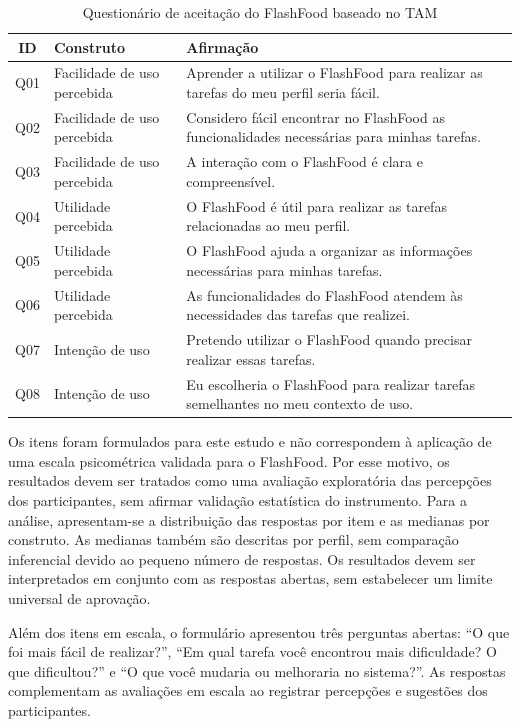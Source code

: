 \begin{table}[htbp]
\centering
\caption{Questionário de aceitação do FlashFood baseado no TAM}
\label{tab:questionario-tam}
\footnotesize
\begin{tabularx}{\textwidth}{c p{3.2cm} X}
\hline
\textbf{ID} & \textbf{Construto} & \textbf{Afirmação} \\
\hline
Q01 & Facilidade de uso percebida & Aprender a utilizar o FlashFood para realizar as tarefas do meu perfil seria fácil. \\
\hline
Q02 & Facilidade de uso percebida & Considero fácil encontrar no FlashFood as funcionalidades necessárias para minhas tarefas. \\
\hline
Q03 & Facilidade de uso percebida & A interação com o FlashFood é clara e compreensível. \\
\hline
Q04 & Utilidade percebida & O FlashFood é útil para realizar as tarefas relacionadas ao meu perfil. \\
\hline
Q05 & Utilidade percebida & O FlashFood ajuda a organizar as informações necessárias para minhas tarefas. \\
\hline
Q06 & Utilidade percebida & As funcionalidades do FlashFood atendem às necessidades das tarefas que realizei. \\
\hline
Q07 & Intenção de uso & Pretendo utilizar o FlashFood quando precisar realizar essas tarefas. \\
\hline
Q08 & Intenção de uso & Eu escolheria o FlashFood para realizar tarefas semelhantes no meu contexto de uso. \\
\hline
\end{tabularx}
\end{table}

Os itens foram formulados para este estudo e não correspondem à aplicação de uma escala psicométrica validada para o FlashFood. Por esse motivo, os resultados devem ser tratados como uma avaliação exploratória das percepções dos participantes, sem afirmar validação estatística do instrumento. Para a análise, apresentam-se a distribuição das respostas por item e as medianas por construto. As medianas também são descritas por perfil, sem comparação inferencial devido ao pequeno número de respostas. Os resultados devem ser interpretados em conjunto com as respostas abertas, sem estabelecer um limite universal de aprovação.

Além dos itens em escala, o formulário apresentou três perguntas abertas: “O que foi mais fácil de realizar?”, “Em qual tarefa você encontrou mais dificuldade? O que dificultou?” e “O que você mudaria ou melhoraria no sistema?”. As respostas complementam as avaliações em escala ao registrar percepções e sugestões dos participantes.

